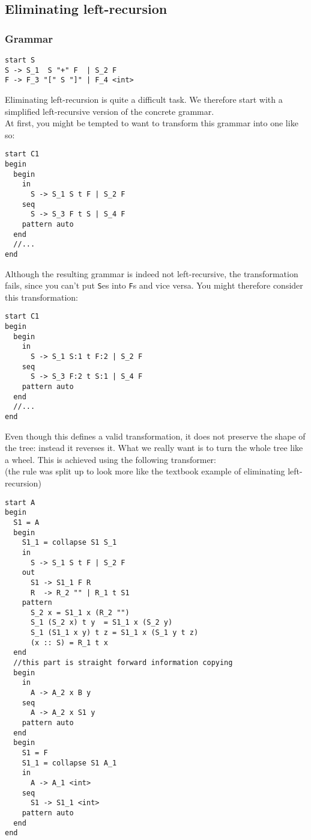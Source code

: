 \documentclass[a4paper]{article}
\begin{document}
\subsection*{Eliminating left-recursion}
\subsubsection*{Grammar}
\begin{lstlisting}[language=grammar]
start S
S -> S_1  S "+" F  | S_2 F
F -> F_3 "[" S "]" | F_4 <int>
\end{lstlisting}
Eliminating left-recursion is quite a difficult task. We therefore start with a simplified left-recursive version of the concrete grammar.\\
At first, you might be tempted to want to transform this grammar into one like so:
\begin{lstlisting}[language=transformer]
start C1
begin
  begin
    in
      S -> S_1 S t F | S_2 F
    seq
      S -> S_3 F t S | S_4 F
    pattern auto
  end
  //...
end
\end{lstlisting}
Although the resulting grammar is indeed not left-recursive, the transformation fails, since you can't put \verb|S|es into \verb|F|s and vice versa. You might therefore consider this transformation:
\begin{lstlisting}[language=transformer]
start C1
begin
  begin
    in
      S -> S_1 S:1 t F:2 | S_2 F
    seq
      S -> S_3 F:2 t S:1 | S_4 F
    pattern auto
  end
  //...
end
\end{lstlisting}
Even though this defines a valid transformation, it does not preserve the shape of the tree: instead it reverses it. What we really want is to turn the whole tree like a wheel. This is achieved using the following transformer:\\
{\small (the rule was split up to look more like the textbook example of eliminating left-recursion)}
\begin{lstlisting}[language=transformer]
start A
begin
  S1 = A
  begin
    S1_1 = collapse S1 S_1 
    in
      S -> S_1 S t F | S_2 F
    out
      S1 -> S1_1 F R
      R  -> R_2 "" | R_1 t S1  
    pattern
      S_2 x = S1_1 x (R_2 "")
      S_1 (S_2 x) t y  = S1_1 x (S_2 y)
      S_1 (S1_1 x y) t z = S1_1 x (S_1 y t z)
      (x :: S) = R_1 t x
  end
  //this part is straight forward information copying
  begin
    in
      A -> A_2 x B y
    seq
      A -> A_2 x S1 y
    pattern auto
  end
  begin
    S1 = F
    S1_1 = collapse S1 A_1
    in
      A -> A_1 <int>
    seq
      S1 -> S1_1 <int>
    pattern auto
  end
end
\end{lstlisting}
\end{document}
